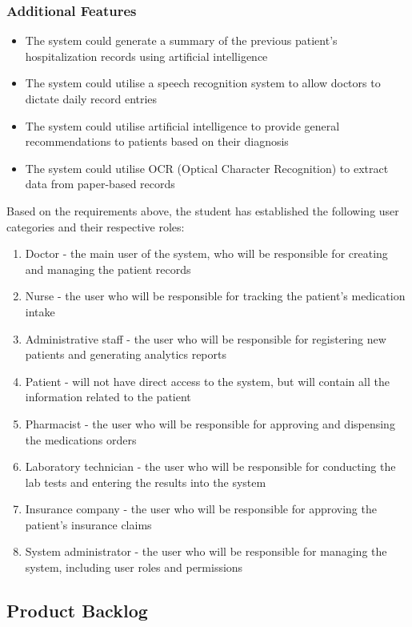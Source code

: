 \subsubsection{Additional Features}
\begin{itemize}
    \item The system could generate a summary of the previous patient's hospitalization records using artificial intelligence
    \item The system could utilise a speech recognition system to allow doctors to dictate daily record entries
    \item The system could utilise artificial intelligence to provide general recommendations to patients based on their diagnosis
    \item The system could utilise OCR (Optical Character Recognition) to extract data from paper-based records
\end{itemize}

Based on the requirements above, the student has established the following user categories and their respective roles:
\begin{enumerate}
    \item Doctor - the main user of the system, who will be responsible for creating and managing the patient records
    \item Nurse - the user who will be responsible for tracking the patient's medication intake
    \item Administrative staff - the user who will be responsible for registering new patients and generating analytics reports
    \item Patient - will not have direct access to the system, but will contain all the information related to the patient
    \item Pharmacist - the user who will be responsible for approving and dispensing the medications orders
    \item Laboratory technician - the user who will be responsible for conducting the lab tests and entering the results into the system
    \item Insurance company - the user who will be responsible for approving the patient's insurance claims
    \item System administrator - the user who will be responsible for managing the system, including user roles and permissions
\end{enumerate}

\subsection{Product Backlog}

